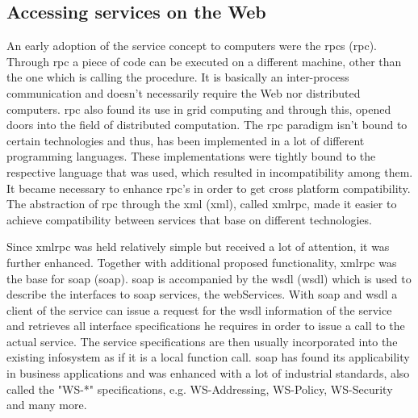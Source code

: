 \subsection{Accessing services on the Web}
An early adoption of the service concept to computers were the \textrm{\acrlong{rpc}s (\acrshort{rpc})}\cite{Birrell:1984:IRP:2080.357392}.
Through \textrm{\acrshort{rpc}} a piece of code can be executed on a different machine, other than the one which is calling the procedure.
It is basically an inter-process communication and doesn't necessarily require the Web nor distributed computers.
\textrm{\acrshort{rpc}} also found its use in grid computing\cite{seymour2002overview} and through this, opened doors into the field of distributed computation.
The \textrm{\acrshort{rpc}} paradigm isn't bound to certain technologies and thus, has been implemented in a lot of different programming languages.
These implementations were tightly bound to the respective language that was used, which resulted in incompatibility among them.
It became necessary to enhance \textrm{\acrshort{rpc}}'s in order to get cross platform compatibility.
The abstraction of \textrm{\acrshort{rpc}} through the \textrm{\acrlong{xml}} (\textrm{\acrshort{xml}})\cite{bray1998extensible}, called \textrm{\acrshort{xmlrpc}}, made it easier to achieve compatibility between services that base on different technologies.

Since \textrm{\acrshort{xmlrpc}} was held relatively simple but received a lot of attention, it was further enhanced.
Together with additional proposed functionality, \textrm{\acrshort{xmlrpc}} was the base for \textrm{\acrlong{soap}} (\textrm{\acrshort{soap}})\cite{box2000simple}.
\textrm{\acrshort{soap}} is accompanied by the \textrm{\acrlong{wsdl} (\acrshort{wsdl})}\cite{christensen2001web} which is used to describe the interfaces to \acrshort{soap} services, the \textrm{\glspl{webService}}.
With \textrm{\acrshort{soap}} and \textrm{\acrshort{wsdl}} a client of the service can issue a request for the \textrm{\acrshort{wsdl}} information of the service and retrieves all interface specifications he requires in order to issue a call to the actual service.
The service specifications are then usually incorporated into the existing \textrm{\gls{infosystem}} as if it is a local function call.
\textrm{\acrshort{soap}} has found its applicability in business applications\cite{journals/itpro/BarrosD06} and was enhanced with a lot of industrial standards, also called the "WS-*" specifications, e.g. WS-Addressing, WS-Policy, WS-Security and many more.

